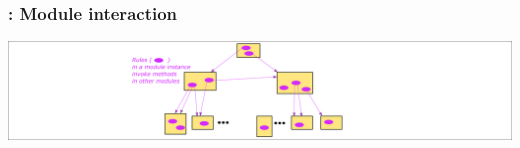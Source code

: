
\begin{frame}
\frametitle{{\BSV}: Module interaction}

\begin{center}
\includegraphics[width=\textwidth]{../Figures/Fig_BSV_module_interaction}
\end{center}

\end{frame}


